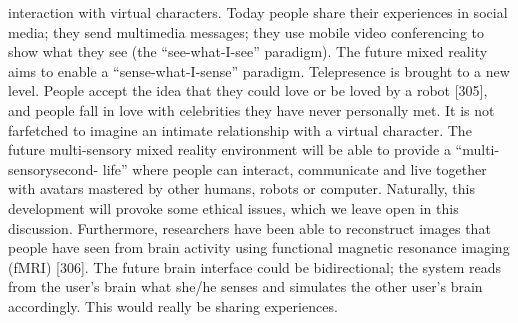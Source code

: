 interaction with virtual characters. Today people share their experiences in social media; they send multimedia messages; they use mobile video conferencing to show what they see (the “see-what-I-see” paradigm). The future mixed reality aims to enable a “sense-what-I-sense” paradigm. Telepresence is brought to a new level. People accept the idea that they could love or be loved by a robot [305], and people fall in love with celebrities they have never personally met. It is not farfetched to imagine an intimate relationship with a virtual character. The future multi-sensory mixed reality environment will be able to provide a “multi-sensorysecond- life” where people can interact, communicate and live together with avatars mastered by other humans, robots or computer. Naturally, this development will provoke some ethical issues, which we leave open in this discussion. Furthermore, researchers have been able to reconstruct images that people have seen from brain activity using functional magnetic resonance imaging (fMRI) [306]. The future brain interface could be bidirectional; the system reads from the user’s brain what she/he senses and simulates the other user’s brain accordingly. This would really be sharing experiences.
